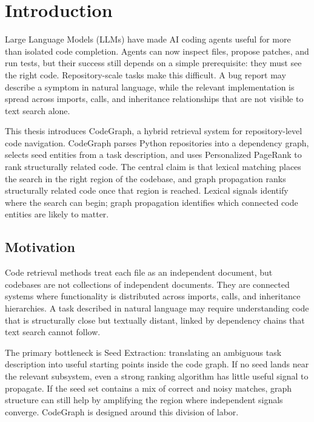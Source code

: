 
\chapter{Introduction}
\label{ch:introduction}

Large Language Models (LLMs) have made AI coding agents useful for more than isolated code completion. Agents can now inspect files, propose patches, and run tests, but their success still depends on a simple prerequisite: they must see the right code. Repository-scale tasks make this difficult. A bug report may describe a symptom in natural language, while the relevant implementation is spread across imports, calls, and inheritance relationships that are not visible to text search alone.

This thesis introduces CodeGraph, a hybrid retrieval system for repository-level code navigation. CodeGraph parses Python repositories into a dependency graph, selects seed entities from a task description, and uses Personalized PageRank to rank structurally related code. The central claim is that lexical matching places the search in the right region of the codebase, and graph propagation ranks structurally related code once that region is reached. Lexical signals identify where the search can begin; graph propagation identifies which connected code entities are likely to matter.

\section{Motivation}
\label{sec:motivation}

Code retrieval methods treat each file as an independent document, but codebases are not collections of independent documents. They are connected systems where functionality is distributed across imports, calls, and inheritance hierarchies. A task described in natural language may require understanding code that is structurally close but textually distant, linked by dependency chains that text search cannot follow.

The primary bottleneck is Seed Extraction: translating an ambiguous task description into useful starting points inside the code graph. If no seed lands near the relevant subsystem, even a strong ranking algorithm has little useful signal to propagate. If the seed set contains a mix of correct and noisy matches, graph structure can still help by amplifying the region where independent signals converge. CodeGraph is designed around this division of labor.

